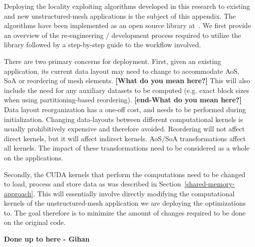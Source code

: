 Deploying the locality exploiting algorithms developed in this research to 
existing and new unstructured-mesh applications is the subject of this appendix. 
The algorithms have been implemented as an open source library 
at~\cite{lib-repo}. We first provide an overview of the re-engineering / 
development process required to utilize the library followed by a step-by-step 
guide to the workflow involved. 

There are two primary concerns for deployment. First, given an existing 
application, its current data layout may need to change to accommodate AoS, SoA 
or reordering of mesh elements. \textbf{[What do you mean here?]}  This will 
also include the need for any auxiliary datasets to be computed (e.g. exact 
block sizes when using partitioning-based reordering). \textbf{[end-What do you 
mean here?]} Data layout reorganization has a one-off cost, and needs to be 
performed during initialization. Changing data-layouts between different 
computational kernels is usually prohibitively expensive and therefore avoided. 
Reordering will not affect direct kernels, but it will affect indirect kernels. 
AoS/SoA transformations affect all kernels. The impact of these transformations 
need to be considered as a whole on the applications. 

Secondly, the CUDA kernels that perform the computations need to be changed to 
load, process and store data as was described in 
Section~\ref{shared-memory-approach}. This will essentially involve directly 
modifying the computational kernels of the unstructured-mesh application we are 
deploying the optimizations to. The goal therefore is to minimize the amount 
of changes required to be done on the original code.

\textbf{Done up to here - Gihan}



